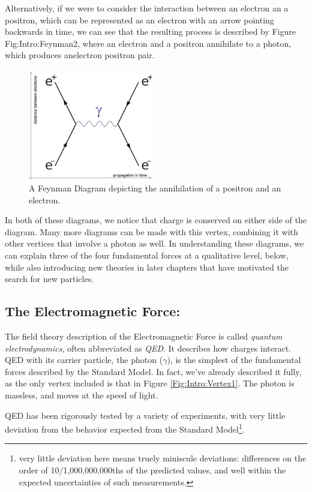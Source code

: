 Alternatively, if we were to consider the interaction between an electron an a positron, which can be represented as an electron with an arrow pointing backwards in time, we can see that the resulting process is described by Figure {Fig:Intro:Feynman2}, where an electron and a positron annihilate to a photon, which produces anelectron positron pair.
\begin{figure}[h]
    \centering
        \includegraphics[width=0.49\textwidth]{F1/FeynDiag2}
        \caption{A Feynman Diagram depicting the annihilation of a positron and an electron.}
        \label{Fig:Intro:Feynman2}
\end{figure}
In both of these diagrams, we notice that charge is conserved on either side of the diagram. Many more diagrams can be made with this vertex, combining it with other vertices that involve a photon as well. In understanding these diagrams, we can explain three of the four fundamental forces at a qualitative level, below, while also introducing new theories in later chapters that have motivated the search for new particles.

\subsection{The Electromagnetic Force:}
The field theory description of the Electromagnetic Force is called \textit{quantum electrodynamics}, often abbreviated as \textit{QED}. It describes how charges interact. QED with its carrier particle, the photon ($\gamma$), is the simplest of the fundamental forces described by the Standard Model. In fact, we've already described it fully, as the only vertex included is that in Figure \ref{Fig:Intro:Vertex1}. The photon is massless, and moves at the speed of light. 

QED has been rigorously tested by a variety of experiments, with very little deviation from the behavior expected from the Standard Model\footnote{very little deviation here means truely miniscule deviations: differences on the order of 10/1,000,000,000ths of the predicted values, and well within the expected uncertainties of such measurements.}. 

